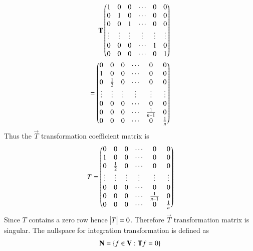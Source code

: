 \documentclass[journal,12pt,twocolumn]{IEEEtran}
\begin{document}
\begin{enumerate}[label=\emph{\alph*)}]
\begin{align}
                        \mathbf{T}\begin{pmatrix}1 & 0 & 0 & \cdots & 0 & 0\\
                                      0 & 1 & 0 & \cdots & 0 & 0 \\
                                      0 & 0 & 1 & \cdots & 0 & 0 \\
                                      \vdots & \vdots & \vdots & \vdots & \vdots & \vdots\\
                                      0 & 0 & 0 & \cdots & 1 & 0 \\
                                      0 & 0 & 0 & \cdots & 0 & 1\end{pmatrix} \\
                              =\begin{pmatrix}0 & 0 & 0 & \cdots & 0 & 0\\
                                      1 & 0 & 0 & \cdots & 0 & 0\\
				      0 & \frac{1}{2} & 0 & \cdots & 0 & 0\\
                                      \vdots & \vdots & \vdots & \vdots & \vdots & \vdots\\
				      0 & 0 & 0 & \cdots & 0 & 0 \\
				      0 & 0 & 0 & \cdots & \frac{1}{n-1} & 0 \\
				      0 & 0 & 0 & \cdots & 0 & \frac{1}{n} \end{pmatrix}
                \end{align}
Thus the $\vec{T}$ transformation coefficient matrix is
\begin{align}
	                     T=\begin{pmatrix}0 & 0 & 0 & \cdots & 0 & 0\\
                                      1 & 0 & 0 & \cdots & 0 & 0\\
                                      0 & \frac{1}{2} & 0 & \cdots & 0 & 0\\
                                      \vdots & \vdots & \vdots & \vdots & \vdots & \vdots\\
                                      0 & 0 & 0 & \cdots & 0 & 0 \\
                                      0 & 0 & 0 & \cdots & \frac{1}{n-1} & 0 \\
                                      0 & 0 & 0 & \cdots & 0 & \frac{1}{n} \end{pmatrix} 
\end{align}
Since $T$ contains a zero row hence $\begin{vmatrix}T\end{vmatrix}=0$. Therefore $\vec{T}$ transformation matrix is 
singular.
The nullspace for integration transformation is defined as
\begin{align}
        \mathbf{N}=\left\{f \in \mathbf{V} : \mathbf{T}f=0\right\}
\end{align}

\end{enumerate}
\end{document}
